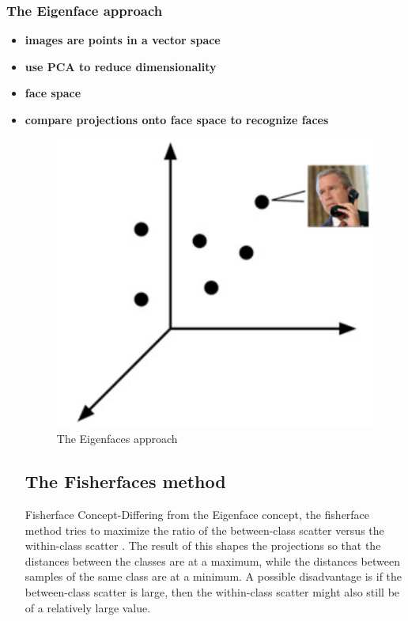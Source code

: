 \documentclass[a4paper,12pt]{report}
\begin{document}
\begin{itemize}
\begin{itemize}
			\subsubsection{The Eigenface approach}
				\begin{itemize}
				\item \textbf{images are points in a vector space} 
				\item \textbf{use PCA to reduce dimensionality}
				\item \textbf{face space} 
				\item \textbf{compare projections onto face space to recognize faces}
				\begin{figure}[h]
					\centering
					\caption{\label{face recognation} The Eigenfaces approach \cite{haar_lbp_hog_comp_pdf}}
					\includegraphics[scale=0.55]{capture1.png}
				\end{figure}
		
		\subsection{The Fisherfaces method}
			Fisherface Concept-Differing from the Eigenface concept, the fisherface method tries to maximize the ratio of the between-class scatter versus the within-class scatter . The result of this shapes the projections so that the distances between the classes are at a maximum, while the distances between samples of the same class are at a minimum. A possible disadvantage is if the between-class scatter is large, then the within-class scatter might also still be of a relatively large value.
			

\end{itemize}
\end{itemize}
\end{itemize}
\end{document}
